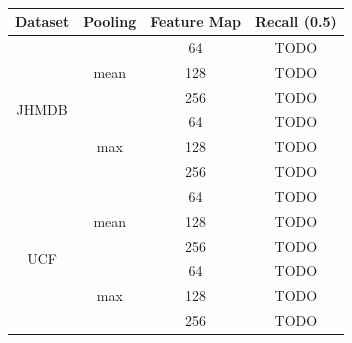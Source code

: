 \documentclass{report}
\begin{document}
\begin{table}[h]
  \centering
  \begin{tabular}{||c | c | c || c||}
    \textbf{Dataset} & \textbf{Pooling} & \textbf{Feature Map} & \textbf{Recall (0.5)} \\
    \hline
    \multirow{6}{*}{JHMDB} & \multirow{3}{*}{mean} & 64 & TODO \\
    \cline{3-4}
    {} & {} & 128 & TODO \\
    \cline{3-4}
    {} & {} & 256 & TODO \\
    \cline{2-4}
    {} & \multirow{3}{*}{max} & 64 & TODO \\
    \cline{3-4}
    {} & {} & 128 & TODO \\
    \cline{3-4}
    {} & {} & 256 & TODO \\
    \hline
    \multirow{6}{*}{UCF} & \multirow{3}{*}{mean} & 64 & TODO \\
    \cline{3-4}
    {} & {} & 128 & TODO \\
    \cline{3-4}
    {} & {} & 256 & TODO \\
    \cline{2-4}
    {} & \multirow{3}{*}{max} & 64 & TODO \\
    \cline{3-4}
    {} & {} & 128 & TODO \\
    \cline{3-4}
    {} & {} & 256 & TODO \\
    \hline


  \end{tabular}
  \caption{}
  \label{table:reg_2_1}
\end{table}

\end{document}
